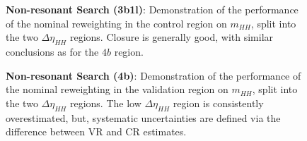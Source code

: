 \begin{figure}[ht]
  \centering
  \caption{\label{fig:nonres-3b1l-CR} \textbf{Non-resonant Search (3b1l)}: Demonstration of the performance of the nominal reweighting in the control region on $m_{HH}$, split into the two $\Delta\eta_{HH}$ regions. Closure is generally good, with similar conclusions as for the $4b$ region.}
\end{figure}

\begin{figure}[ht]
  \centering
  \caption{\label{fig:nonres-4b-VR} \textbf{Non-resonant Search (4b)}: Demonstration of the performance of the nominal reweighting in the validation region on $m_{HH}$, split into the two $\Delta\eta_{HH}$ regions. The low $\Delta\eta_{HH}$ region is consistently overestimated, but, systematic uncertainties are defined via the difference between 
  VR and CR estimates.}
\end{figure}

